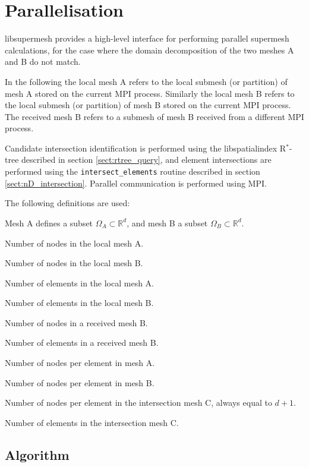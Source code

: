\documentclass{article}
\begin{document}
\section{Parallelisation}

libsupermesh provides a high-level interface for performing parallel supermesh
calculations, for the case where the domain decomposition of the two meshes A
and B do not match. 

In the following the local mesh A refers to the local submesh (or partition) of
mesh A stored on the current MPI process. Similarly the local mesh B refers to
the local submesh (or partition) of mesh B stored on the current MPI process.
The received mesh B refers to a submesh of mesh B received from a different MPI
process.

Candidate intersection identification is performed using the libspatialindex
R${}^*$-tree described in section \ref{sect:rtree_query}, and element
intersections are performed using the \verb+intersect_elements+ routine
described in section \ref{sect:nD_intersection}. Parallel communication is
performed using MPI.

The following definitions are used:
\begin{description}[leftmargin=\parindent,labelindent=\parindent]
  \item[$d$] Mesh A defines a subset $\Omega_A \subset \mathbb{R}^d$, and mesh B
    a subset $\Omega_B \subset \mathbb{R}^d$.
  \item[$V_A$] Number of nodes in the local mesh A.
  \item[$V_B$] Number of nodes in the local mesh B.
  \item[$E_A$] Number of elements in the local mesh A.
  \item[$E_B$] Number of elements in the local mesh B.
  \item[$V_B^*$] Number of nodes in a received mesh B.
  \item[$E_B^*$] Number of elements in a received mesh B.
  \item[$l_A$] Number of nodes per element in mesh A.
  \item[$l_B$] Number of nodes per element in mesh B.
  \item[$l_C$] Number of nodes per element in the intersection mesh C, always
               equal to $d + 1$.
  \item[$E_C$] Number of elements in the intersection mesh C.
\end{description}

\subsection{Algorithm}
\end{document}
